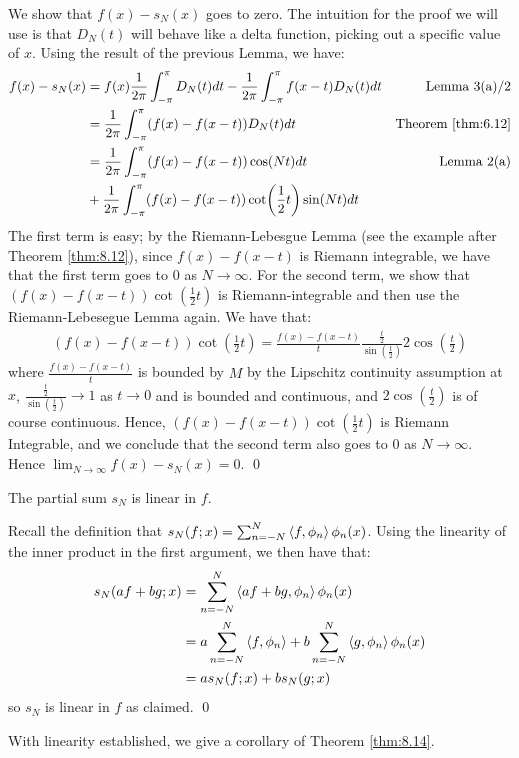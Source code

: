 \begin{nproof}
    We show that $f(x) - s_N(x)$ goes to zero. The intuition for the proof we will use is that $D_N(t)$ will behave like a delta function, picking out a specific value of $x$. Using the result of the previous Lemma, we have:
    \begin{align*}
        f(x) - s_N(x) &= f(x)\frac{1}{2\pi}\int_{-\pi}^\pi D_N(t)dt - \frac{1}{2\pi}\int_{-\pi}^\pi f(x-t)D_N(t)dt & \text{Lemma 3(a)/2}
        \\ &= \frac{1}{2\pi}\int_{-\pi}^\pi (f(x) - f(x - t))D_N(t) dt & \text{Theorem \ref{thm:6.12}}
        \\ &= \frac{1}{2\pi}\int_{-\pi}^\pi (f(x) - f(x - t))\cos(Nt)dt & \text{Lemma 2(a)}
        \\ &+ \frac{1}{2\pi}\int_{-\pi}^\pi (f(x) - f(x-t))\cot(\frac{1}{2}t)\sin(Nt)dt 
    \end{align*}
    The first term is easy; by the Riemann-Lebesgue Lemma (see the example after Theorem \ref{thm:8.12}), since $f(x) - f(x - t)$ is Riemann integrable, we have that the first term goes to $0$ as $N \rightarrow \infty$. For the second term, we show that $(f(x) - f(x-t))\cot(\frac{1}{2}t)$ is Riemann-integrable and then use the Riemann-Lebesegue Lemma again. We have that:
    \begin{align*}
        (f(x) - f(x-t))\cot(\frac{1}{2}t) = \frac{f(x) - f(x-t)}{t} \frac{\frac{t}{2}}{\sin(\frac{t}{2})}2\cos(\frac{t}{2})
    \end{align*}
    where $\frac{f(x) - f(x-t)}{t}$ is bounded by $M$ by the Lipschitz continuity assumption at $x$, $\frac{\frac{t}{2}}{\sin(\frac{t}{2})} \rightarrow 1$ as $t \rightarrow 0$ and is bounded and continuous, and $2\cos(\frac{t}{2})$ is of course continuous. Hence, $(f(x) - f(x-t))\cot(\frac{1}{2}t)$ is Riemann Integrable, and we conclude that the second term also goes to $0$ as $N \rightarrow \infty$. Hence $\lim_{N \rightarrow \infty}f(x) - s_N(x) = 0$. \qed
\end{nproof}

\begin{ntheorem}{}{}
    The partial sum $s_N$ is linear in $f$.
\end{ntheorem}
\begin{nproof}
    Recall the definition that $s_N(f;x) = \sum_{n=-N}^N \left< f, \phi_n \right>\phi_n(x)$. Using the linearity of the inner product in the first argument, we then have that:
    \begin{align*}
        s_N(af + bg; x) &= \sum_{n=-N}^N \left< af + bg, \phi_n \right>\phi_n(x)
        \\ &= a\sum_{n=-N}^N \left< f, \phi_n \right> + b\sum_{n = -N}^N \left< g, \phi_n \right>\phi_n(x)
        \\ &= as_N(f;x) + bs_N(g;x)
    \end{align*}
    so $s_N$ is linear in $f$ as claimed. \qed
\end{nproof}
\noindent With linearity established, we give a corollary of Theorem \ref{thm:8.14}.

